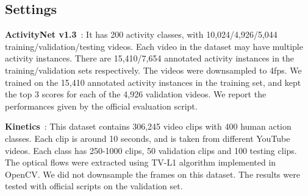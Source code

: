 \documentclass[runningheads]{llncs}
\begin{document}
\begin{table}[htbp]
\centering
  \caption{Ablation analysis of loss functions on ActivityNet v1.3 validation set. $\mathrm{mAP}_e$ stands for the mAP of ensemble score, $\mathrm{mAP}_c$ stands for the mAP of concatenation score.}
\label{tab:untrimmed_loss}
\end{table}

\subsection{Settings}
\textbf{ActivityNet v1.3}~\cite{caba2015activitynet}: It has 200 activity classes, with 10,024/4,926/5,044 training/validation/testing videos. Each video in the dataset may have multiple activity instances. There are 15,410/7,654 annotated activity instances in the training/validation sets respectively. The videos were downsampled to 4fps. We trained on the 15,410 annotated activity instances in the training set, and kept the top 3 scores for each of the 4,926 validation videos. We report the performances given by the official evaluation script.

\textbf{Kinetics}~\cite{kay2017kinetics}: This dataset contains 306,245 video clips with 400 human action classes. Each clip is around 10 seconds, and is taken from different YouTube videos. Each class has 250-1000 clips, 50 validation clips and 100 testing clips. The optical flows were extracted using TV-L1 algorithm implemented in OpenCV. We did not downsample the frames on this dataset. The results were tested with official scripts on the validation set.
\end{document}
